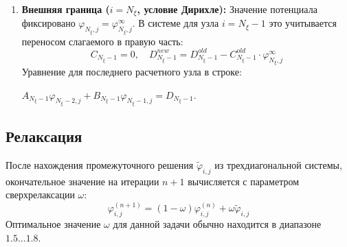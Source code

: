 \begin{enumerate}
		\item \textbf{Внешняя граница ($i=N_\xi$, условие Дирихле):} 
		Значение потенциала фиксировано $\varphi_{N_\xi,j} = \varphi_{N_\xi,j}^\infty$. В системе для узла $i=N_\xi-1$ это учитывается переносом слагаемого в правую часть:
		\[ C_{N_\xi-1} = 0, \quad D_{N_\xi-1}^{new} = D_{N_\xi-1}^{old} - C_{N_\xi-1}^{old} \cdot \varphi_{N_\xi,j}^\infty \]
		Уравнение для последнего расчетного узла в строке: 
		
		$A_{N_\xi-1} \varphi_{N_\xi-2,j} + B_{N_\xi-1} \varphi_{N_\xi-1,j} = D_{N_\xi-1}$.

	\end{enumerate}
	
	\subsection{Релаксация}
	
	После нахождения промежуточного решения $\tilde{\varphi}_{i,j}$ из трехдиагональной системы, окончательное значение на итерации $n+1$ вычисляется с параметром сверхрелаксации $\omega$:
	\begin{equation}
		\varphi_{i,j}^{(n+1)} = (1 - \omega) \varphi_{i,j}^{(n)} + \omega \tilde{\varphi}_{i,j}
	\end{equation}
	Оптимальное значение $\omega$ для данной задачи обычно находится в диапазоне $1.5 \dots 1.8$.
